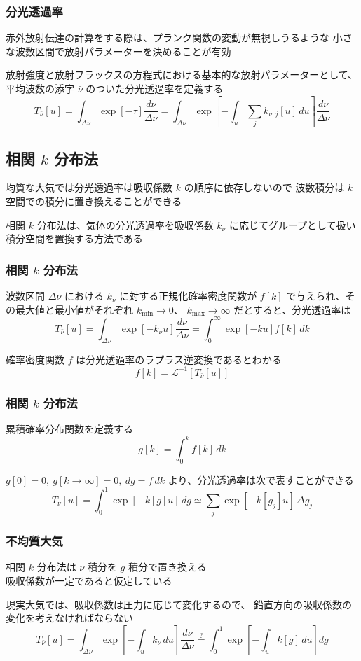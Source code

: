 \documentclass[unicode,colorlinks]{beamer}
\begin{document}
\begin{frame}
	\frametitle{分光透過率}
	赤外放射伝達の計算をする際は、プランク関数の変動が無視しうるような
	小さな波数区間で放射パラメーターを決めることが有効

	放射強度と放射フラックスの方程式における基本的な放射パラメーターとして、
	平均波数の添字 $\bar\nu$ のついた分光透過率を定義する
	\[
		T_{\bar\nu}[u]
		=\int_{\Delta\nu}\exp[-\tau]\frac{d\nu}{\Delta\nu}
		=\int_{\Delta\nu}\exp\left[-\int_u\sum_j k_{\nu,j}[u]\,du\right]\frac{d\nu}{\Delta\nu}
	\]
\end{frame}

\begin{frame}
	\section{相関 $k$ 分布法}
	均質な大気では分光透過率は吸収係数 $k$ の順序に依存しないので
	波数積分は $k$ 空間での積分に置き換えることができる

	相関 $k$ 分布法は、気体の分光透過率を吸収係数 $k_\nu$ に応じてグループとして扱い
	積分空間を置換する方法である
\end{frame}

\begin{frame}
	\frametitle{相関 $k$ 分布法}
	波数区間 $\Delta\nu$ における $k_\nu$ に対する正規化確率密度関数が
	$f[k]$ で与えられ、その最大値と最小値がそれぞれ $k_{\mathrm{min}}\to0$、
	$k_{\mathrm{max}}\to\infty$ だとすると、分光透過率は
	\[T_{\bar\nu}[u]=\int_{\Delta\nu}\exp[-k_\nu u]\frac{d\nu}{\Delta\nu}=\int^\infty_0 \exp[-ku]f[k]\,dk\]

	確率密度関数 $f$ は分光透過率のラプラス逆変換であるとわかる
	\[f[k]=\mathcal{L}^{-1}[T_{\bar\nu}[u]]\]
\end{frame}

\begin{frame}
	\frametitle{相関 $k$ 分布法}
	累積確率分布関数を定義する
	\[g[k]=\int^k_0 f[k]\,dk\]

	$g[0]=0,\ g[k\to\infty]=0,\ dg=f\,dk$ より、分光透過率は次で表すことができる
	\[T_{\bar\nu}[u]=\int^1_0 \exp[-k[g]u]\,dg\simeq\sum_j\exp[-k[g_j]u]\,\Delta g_j\]
\end{frame}

\begin{frame}
	\frametitle{不均質大気}
	相関 $k$ 分布法は $\nu$ 積分を $g$ 積分で置き換える\\
	吸収係数が一定であると仮定している

	現実大気では、吸収係数は圧力に応じて変化するので、
	鉛直方向の吸収係数の変化を考えなければならない
	\[
		T_{\bar\nu}[u]
		=\int_{\Delta\nu}\exp\left[-\int_u k_\nu\,du\right]\frac{d\nu}{\Delta\nu}
		\stackrel{?}{=}\int^1_0\exp\left[-\int_uk[g]\,du\right]dg
	\]
\end{frame}
\end{document}
